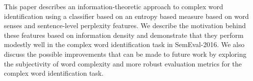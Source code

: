 This paper describes an information-theoretic approach to complex word identification using a classifier based on an entropy based measure based on word senses and sentence-level perplexity features. We describe the motivation behind these features based on information density and demonstrate that they perform modestly well in the complex word identification task in SemEval-2016. We also discuss the possible improvements that can be made to future work by exploring the subjectivity of word complexity and more robust evaluation metrics for the complex word identification task.

